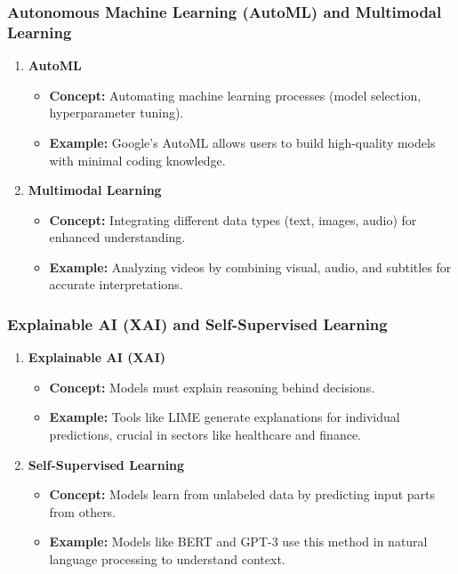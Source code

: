 \documentclass[aspectratio=169]{beamer}
\begin{document}
\begin{frame}[fragile]
    \frametitle{Autonomous Machine Learning (AutoML) and Multimodal Learning}
    \begin{enumerate}
        \item \textbf{AutoML}
            \begin{itemize}
                \item \textbf{Concept:} Automating machine learning processes (model selection, hyperparameter tuning).
                \item \textbf{Example:} Google's AutoML allows users to build high-quality models with minimal coding knowledge.
            \end{itemize}
        
        \item \textbf{Multimodal Learning}
            \begin{itemize}
                \item \textbf{Concept:} Integrating different data types (text, images, audio) for enhanced understanding.
                \item \textbf{Example:} Analyzing videos by combining visual, audio, and subtitles for accurate interpretations.
            \end{itemize}
    \end{enumerate}
\end{frame}

\begin{frame}[fragile]
    \frametitle{Explainable AI (XAI) and Self-Supervised Learning}
    \begin{enumerate}
        \item \textbf{Explainable AI (XAI)}
            \begin{itemize}
                \item \textbf{Concept:} Models must explain reasoning behind decisions.
                \item \textbf{Example:} Tools like LIME generate explanations for individual predictions, crucial in sectors like healthcare and finance.
            \end{itemize}
        
        \item \textbf{Self-Supervised Learning}
            \begin{itemize}
                \item \textbf{Concept:} Models learn from unlabeled data by predicting input parts from others.
                \item \textbf{Example:} Models like BERT and GPT-3 use this method in natural language processing to understand context.
            \end{itemize}
    \end{enumerate}
\end{frame}
\end{document}

